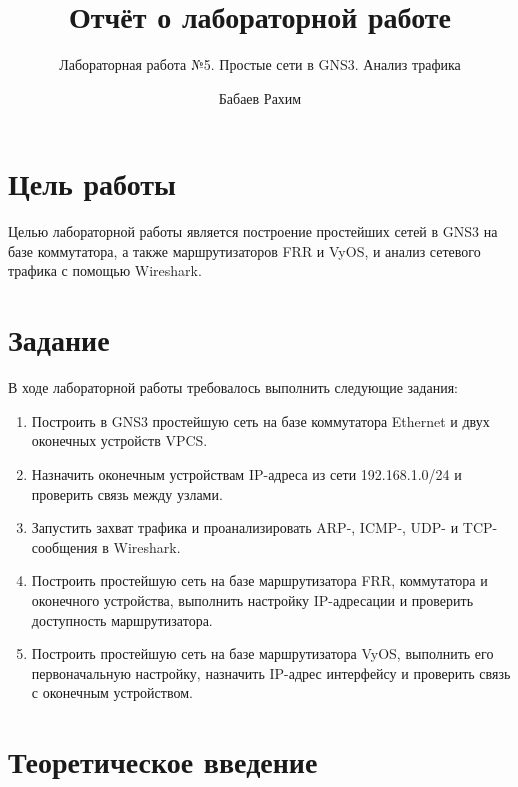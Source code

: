 \documentclass[
  english,
  russian,
  12pt,
  a4paper,
  DIV=11,
  numbers=noendperiod]{scrreprt}
\title{Отчёт о лабораторной работе}
\subtitle{Лабораторная работа №5. Простые сети в GNS3. Анализ трафика}
\author{Бабаев Рахим}
\date{}
\providecommand{\tightlist}{%
  \setlength{\itemsep}{0pt}\setlength{\parskip}{0pt}}
\renewcommand*\contentsname{Содержание}
\newcommand\contentsname{Содержание}
\begin{document}
\maketitle

\renewcommand*\contentsname{Содержание}
{
\setcounter{tocdepth}{1}
\tableofcontents
}
\listoffigures
\listoftables

\chapter{Цель
работы}\label{ux446ux435ux43bux44c-ux440ux430ux431ux43eux442ux44b}

Целью лабораторной работы является построение простейших сетей в GNS3 на
базе коммутатора, а также маршрутизаторов FRR и VyOS, и анализ сетевого
трафика с помощью Wireshark.

\chapter{Задание}\label{ux437ux430ux434ux430ux43dux438ux435}

В ходе лабораторной работы требовалось выполнить следующие задания:

\begin{enumerate}
\def\labelenumi{\arabic{enumi}.}
\tightlist
\item
  Построить в GNS3 простейшую сеть на базе коммутатора Ethernet и двух
  оконечных устройств VPCS.
\item
  Назначить оконечным устройствам IP-адреса из сети 192.168.1.0/24 и
  проверить связь между узлами.
\item
  Запустить захват трафика и проанализировать ARP-, ICMP-, UDP- и
  TCP-сообщения в Wireshark.
\item
  Построить простейшую сеть на базе маршрутизатора FRR, коммутатора и
  оконечного устройства, выполнить настройку IP-адресации и проверить
  доступность маршрутизатора.
\item
  Построить простейшую сеть на базе маршрутизатора VyOS, выполнить его
  первоначальную настройку, назначить IP-адрес интерфейсу и проверить
  связь с оконечным устройством.
\end{enumerate}

\chapter{Теоретическое
введение}\label{ux442ux435ux43eux440ux435ux442ux438ux447ux435ux441ux43aux43eux435-ux432ux432ux435ux434ux435ux43dux438ux435}
\end{document}
